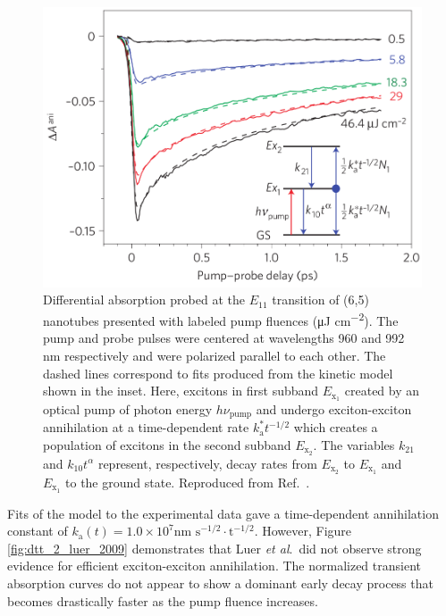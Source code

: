 \begin{figure}[H]
	\centering
	\includegraphics[scale=1.2]{images/chapter_prior_works/dtt_2_luer_2009}
	\caption{Differential absorption probed at the $E_{11}$ transition of (6,5) nanotubes presented with labeled pump fluences (\si{\micro \joule} \si{\cm^{-2}}). The pump and probe pulses were centered at wavelengths 960 and 992 nm respectively and were polarized parallel to each other. The dashed lines correspond to fits produced from the kinetic model shown in the inset. Here, excitons in first subband $E_{\text{x}_1}$ created by an optical pump of photon energy $h \nu_\text{pump}$ and undergo exciton-exciton annihilation at a time-dependent rate $k_\text{a}^* t^{-1/2}$ which creates a population of excitons in the second subband $E_{\text{x}_2}$. The variables $k_{21}$ and $k_{10}t^{\alpha}$ represent, respectively, decay rates from $E_{\text{x}_2}$ to $E_{\text{x}_1}$ and $E_{\text{x}_1}$ to the ground state. Reproduced from Ref.\ \cite{luer2009size}.}
	\label{fig:dtt_luer_2009}
\end{figure}


Fits of the model to the experimental data gave a time-dependent annihilation constant of $k_\text{a}(t) = 1.0 \times 10^7 \text{nm } \text{s}^{-1/2} \cdot \text{t}^{-1/2}$. However, Figure \ref{fig:dtt_2_luer_2009} demonstrates that Luer \textit{et al}.\ did not observe strong evidence for efficient exciton-exciton annihilation. The normalized transient absorption curves do not appear to show a dominant early decay process that becomes drastically faster as the pump fluence increases.

